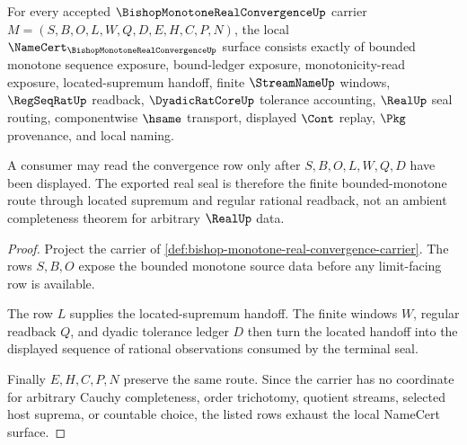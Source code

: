 \begin{theorem}
\label{thm:bishop-monotone-real-convergence-namecert-obligations}
For every accepted $\BishopMonotoneRealConvergenceUp$ carrier $M=(S,B,O,L,W,Q,D,E,H,C,P,N)$, the local $\NameCert_{\BishopMonotoneRealConvergenceUp}$ surface consists exactly of bounded monotone sequence exposure, bound-ledger exposure, monotonicity-read exposure, located-supremum handoff, finite $\StreamNameUp$ windows, $\RegSeqRatUp$ readback, $\DyadicRatCoreUp$ tolerance accounting, $\RealUp$ seal routing, componentwise $\hsame$ transport, displayed $\Cont$ replay, $\Pkg$ provenance, and local naming.

A consumer may read the convergence row only after $S,B,O,L,W,Q,D$ have been displayed. The exported real seal is therefore the finite bounded-monotone route through located supremum and regular rational readback, not an ambient completeness theorem for arbitrary $\RealUp$ data.
\end{theorem}
\begin{proof}
Project the carrier of \autoref{def:bishop-monotone-real-convergence-carrier}. The rows $S,B,O$ expose the bounded monotone source data before any limit-facing row is available.

The row $L$ supplies the located-supremum handoff. The finite windows $W$, regular readback $Q$, and dyadic tolerance ledger $D$ then turn the located handoff into the displayed sequence of rational observations consumed by the terminal seal.

Finally $E,H,C,P,N$ preserve the same route. Since the carrier has no coordinate for arbitrary Cauchy completeness, order trichotomy, quotient streams, selected host suprema, or countable choice, the listed rows exhaust the local NameCert surface.
\end{proof}

